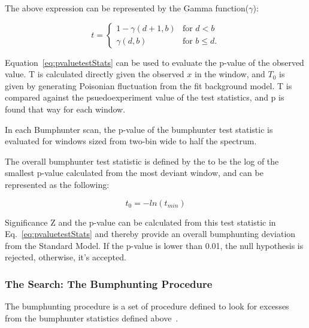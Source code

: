     The above expression can be represented by the Gamma function($\gamma$): 

	\begin{equation}
    t=
    \begin{cases} 1-\gamma(d+1, b) &  \textrm{for $d < b$}
    \\
    \gamma(d,b) &  \textrm{for $b \leq d$}.
    \end{cases}
    \end{equation}
    


    Equation~\ref{eq:pvaluetestStats} can be used to evaluate the p-value of the observed value. T is calculated directly given the observed $x$ in the window, and $T_{0}$ is given by generating Poisonian fluctuation from the fit background model. T is compared against the psuedoexperiment value of the test statistics, and p is found that way for each window. 

    In each Bumphunter scan, the p-value of the bumphunter test statistic is evaluated for windows sized from two-bin wide to half the spectrum.

    The overall bumphunter test statistic is defined by the to be the log of the smallest p-value calculated from the most deviant window, and can be represented as the following:

    \begin{equation}
        t_{0} = - ln (t_{min}) 
    \end{equation}

    Significance Z and the p-value can be calculated from this test statistic in Eq.~\ref{eq:pvaluetestStats} and thereby provide an overall bumphunting deviation from the Standard Model. If the p-value is lower than 0.01, the null hypothesis is rejected, otherwise, it's accepted.


    \subsubsection{The Search: The Bumphunting Procedure}
    The bumphunting procedure is a set of procedure defined to look for excesses from the bumphunter statistics defined above~\cite{Pachal:2063032}.

